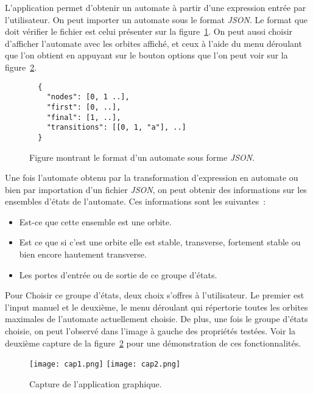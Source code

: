L'application permet d'obtenir un automate à partir d'une expression entrée
par l'utilisateur. On peut importer un automate sous le format \textit{JSON}. Le
format que doit vérifier le fichier est celui présenter sur la
figure~\ref{fig:jsonFormat}. On peut aussi choisir d'afficher l'automate avec
les orbites affiché, et ceux à l'aide du menu déroulant que l'on obtient en
appuyant sur le bouton options que l'on peut voir sur la
figure~\ref{fig:cap1}.

\begin{figure}[H]
    \begin{verbatim}
  {
    "nodes": [0, 1 ..],
    "first": [0, ..],
    "final": [1, ..],
    "transitions": [[0, 1, "a"], ..] 
  }
  \end{verbatim}
    \caption{Figure montrant le format d'un automate sous forme \textit{JSON}.}
    \label{fig:jsonFormat}
\end{figure}

Une fois l'automate obtenu par la transformation d'expression en automate ou
bien par importation d'un fichier \textit{JSON}, on peut obtenir des
informations sur les ensembles d'états de l'automate. Ces informations sont les
suivantes~:

\begin{itemize}
    \item[\textbullet] Est-ce que cette ensemble est une orbite.
    \item[\textbullet] Est ce que si c'est une orbite elle est stable, transverse,
        fortement stable ou bien encore hautement transverse.
    \item[\textbullet] Les portes d'entrée ou de sortie de ce groupe d'états.
\end{itemize}

Pour Choisir ce groupe d'états, deux choix s'offres à l'utilisateur. Le premier
est l'input manuel et le deuxième, le menu déroulant qui répertorie toutes les
orbites maximales de l'automate actuellement choisie. De plus, une fois le
groupe d'états choisie, on peut l'observé dans l'image à gauche des propriétés
testées. Voir la deuxième capture de la figure~\ref{fig:cap1} pour une
démonstration de ces fonctionnalités.

\begin{figure}[H]
    \texttt{[image: cap1.png]}
    \texttt{[image: cap2.png]}
    \caption{Capture de l'application graphique.}\label{fig:cap1}
\end{figure}

